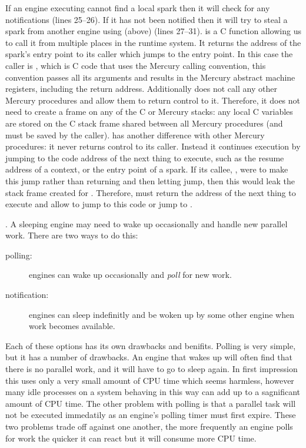 If an engine executing \idle cannot find a local spark then it will
check for any notifications (lines 25--26).
If it has not been notified then it will try to steal a spark from another
engine using \trystealspark (above) (lines 27--31).
\trystealspark is a C function allowing us to call it from multiple places
in the runtime system.
It returns the address of the spark's entry point to its caller which jumps
to the entry point.
In this case the caller is \idle,
which is C code that uses the Mercury calling convention,
this convention passes all its arguments and results in the Mercury abstract
machine registers, including the return address.
Additionally \idle does not call any other Mercury procedures and allow them
to return control to it.
Therefore, it does not need to create a frame on any of the C or Mercury stacks:
any local C variables are stored on the C stack frame shared between all
Mercury procedures (and must be saved by the caller).
\idle has another difference with other Mercury procedures:
it never returns control to its caller.
Instead it continues execution by jumping to the code address of the next
thing to execute,
such as the resume address of a context,
or the entry point of a spark.
If its callee, \trystealspark, were to make this jump rather than
returning and then letting \idle jump,
then this would leak the stack frame created for \trystealspark.
Therefore, \trystealspark must return the address of the next thing to
execute and allow \idle to jump to this code or jump to \sleep.

.
A sleeping engine may need to wake up occasionally and handle new parallel
work.
There are two ways to do this:

\begin{description}

    \item[polling:] engines can wake up occasionally and \emph{poll} for new
    work.

    \item[notification:] engines can sleep indefinitly and be woken up by
    some other engine when work becomes available.

\end{description}

\noindent
Each of these options has its own drawbacks and benifits.
Polling is very simple, but it has a number of drawbacks.
An engine that wakes up will often find that there is no parallel work,
and it will have to go to sleep again.
In first impression this uses only a very small amount of CPU time which
seems harmless,
however many idle processes on a system behaving in this way can add up to a
sagnificant amount of CPU time.
The other problem with polling is that a parallel task will not be executed
immedatily as an engine's polling timer must first expire.
These two problems trade off against one another,
the more frequently an engine polls for work the quicker it can react but it
will consume more CPU time.
    
